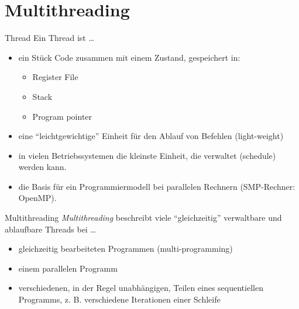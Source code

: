\section{Multithreading}

\begin{defi}{Thread}
    Ein Thread ist \ldots
    \begin{itemize}[\ldots]
        \item ein Stück Code zusammen mit einem Zustand,
              gespeichert in:
              \begin{itemize}
                  \item Register File
                  \item Stack
                  \item Program pointer
              \end{itemize}
        \item eine \enquote{leichtgewichtige} Einheit für den Ablauf von Befehlen (light-weight)
        \item in vielen Betriebssystemen die kleinste Einheit,
              die verwaltet (schedule) werden kann.
        \item die Basis für ein Programmiermodell bei parallelen Rechnern (SMP-Rechner: OpenMP).
    \end{itemize}
\end{defi}

\begin{defi}{Multithreading}
    \emph{Multithreading} beschreibt viele \enquote{gleichzeitig} verwaltbare und ablaufbare Threads bei \ldots
    \begin{itemize}[\ldots]
        \item gleichzeitig bearbeiteten Programmen (multi-programming)
        \item einem parallelen Programm
        \item verschiedenen, in der Regel unabhängigen, Teilen eines sequentiellen Programms,
              z. B. verschiedene Iterationen einer Schleife
    \end{itemize}
\end{defi}

